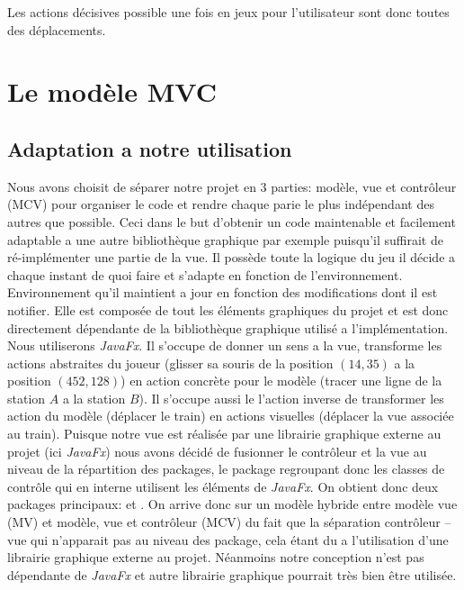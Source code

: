 \documentclass[report, backcover, french, nodocumentinfo]{upmethodology-document}
\begin{document}
				Les actions décisives possible une fois en jeux pour l'utilisateur sont donc toutes des déplacements.

		\section{Le modèle MVC}
			\subsection{Adaptation a notre utilisation}
					Nous avons choisit de séparer notre projet en 3 parties: modèle, vue et contrôleur (MCV) pour organiser le code et rendre chaque parie le plus indépendant des autres que possible. Ceci dans le but d'obtenir un code maintenable et facilement adaptable a une autre bibliothèque graphique par exemple puisqu'il suffirait de ré-implémenter une partie de la vue.
					Il possède toute la logique du jeu il décide a chaque instant de quoi faire et s'adapte en fonction de l’environnement. Environnement qu'il maintient a jour en fonction des modifications dont il est notifier.
					Elle est composée de tout les éléments graphiques du projet et est donc directement dépendante de la bibliothèque graphique utilisé a l'implémentation. Nous utiliserons \textit{JavaFx}.
					Il s'occupe de donner un sens a la vue, transforme les actions abstraites du joueur (glisser sa souris de la position $(14,35)$ a la position $(452,128)$) en action concrète pour le modèle (tracer une ligne de la station $A$ a la station $B$). Il s’occupe aussi le l'action inverse de transformer les action du modèle (déplacer le train) en actions visuelles (déplacer la vue associée au train).
					Puisque notre vue est réalisée par une librairie graphique externe au projet (ici \textit{JavaFx}) nous avons décidé de fusionner le contrôleur et la vue au niveau de la répartition des packages, le package  regroupant donc les classes de contrôle qui en interne utilisent les éléments de \textit{JavaFx}. On obtient donc deux packages principaux:  et .
				\p{}
					On arrive donc sur un modèle hybride entre modèle vue (MV) et modèle, vue et contrôleur (MCV) du fait que la séparation contrôleur -- vue qui n'apparait pas au niveau des package, cela étant du a l'utilisation d'une librairie graphique externe au projet. Néanmoins notre conception n'est pas dépendante de \textit{JavaFx} et autre librairie graphique pourrait très bien être utilisée.
\end{document}
